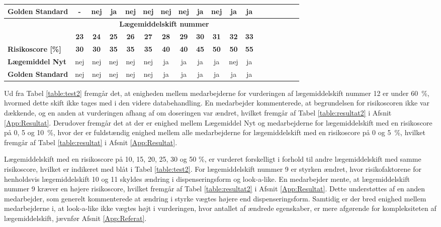 \begin{longtable}{l|c|c|c|c|c|c|c|c|c|c|c|c|c|c|c|c|c}
\cellcolor[HTML]{C0C0C0}\textbf{Golden Standard} & \cellcolor[HTML]{F6E6E5} - & nej & \cellcolor[HTML]{32CB00}ja & nej & nej & nej & \cellcolor[HTML]{32CB00}nej & \cellcolor[HTML]{32CB00} ja & \cellcolor[HTML]{32CB00}nej & \cellcolor[HTML]{32CB00}ja & ja \\ \hline
\rowcolor[HTML]{C0C0C0} & \multicolumn{11}{|c}{\textbf{Lægemiddelskift nummer}} \\ 
\rowcolor[HTML]{C0C0C0} & \textbf{23} & \textbf{24} & \textbf{25} & \textbf{26} & \textbf{27} & \textbf{28} &  \textbf{29} & \textbf{30} & \textbf{31} & \textbf{32} & \textbf{33}  \\ \cline{1-10}
\cellcolor[HTML]{C0C0C0}\textbf{Risikoscore [\%]} & \textbf{30} & \textbf{30} & \textbf{35} & \textbf{35} & \textbf{35} & \textbf{40} & \textbf{40} & \textbf{45} & \textbf{50} & \cellcolor[HTML]{34CDF9}\textbf{50} & \textbf{55} \\ \hline 
\cellcolor[HTML]{C0C0C0}\textbf{Lægemiddel Nyt} & nej & nej & nej & nej & nej & ja & ja & ja & ja & \cellcolor[HTML]{32CB00} nej & ja\\ \hline
\cellcolor[HTML]{C0C0C0}\textbf{Golden Standard} & nej & nej & nej & nej & nej & ja & ja& ja & ja&\cellcolor[HTML]{32CB00}ja & ja \\\hline
\end{longtable}
\vspace{0.5cm}

Ud fra Tabel \ref{table:test2} fremgår det, at enigheden mellem medarbejderne for vurderingen af lægemiddelskift nummer 12 er under 60~\%, hvormed dette skift ikke tages med i den videre databehandling. En medarbejder kommenterede, at begrundelsen for risikoscoren ikke var dækkende, og en anden at vurderingen  afhang af om doseringen var ændret, hvilket fremgår af Tabel \ref{table:resultat2} i Afsnit \ref{App:Resultat}. %
Derudover fremgår det at der er enighed mellem Lægemiddel Nyt og medarbejderne for lægemiddelskift med en risikoscore på 0, 5 og 10~\%, hvor der er  fuldstændig enighed mellem alle medarbejderne for lægemiddelskift med en risikoscore på 0 og 5~\%, hvilket fremgår af Tabel \ref{table:resultat} i Afsnit \ref{App:Resultat}.

Lægemiddelskift med en risikoscore på 10, 15, 20, 25, 30 og 50 \%, er vurderet forskelligt i forhold til andre lægemiddelskift med samme risikoscore, hvilket er indikeret med blåt i Tabel \ref{table:test2}. For lægemiddelskift nummer 9 er styrken ændret, hvor risikofaktorene for henholdsvis lægemiddelskift 10 og 11 skyldes ændring i dispenseringsform og look-a-like. En medarbejder mente, at lægemiddelskift nummer 9 kræver en højere risikoscore, hvilket fremgår af Tabel \ref{table:resultat2} i Afsnit \ref{App:Resultat}. Dette understøttes af en anden medarbejder, som generelt kommenterede at ændring i styrke vægtes højere end dispenseringsform. Samtidig er der bred enighed mellem medarbejderne i, at look-a-like ikke vægtes højt i vurderingen, hvor antallet af ændrede egenskaber,  er mere afgørende for kompleksiteten af lægemiddelskift, jævnfør Afsnit \ref{App:Referat}. 

